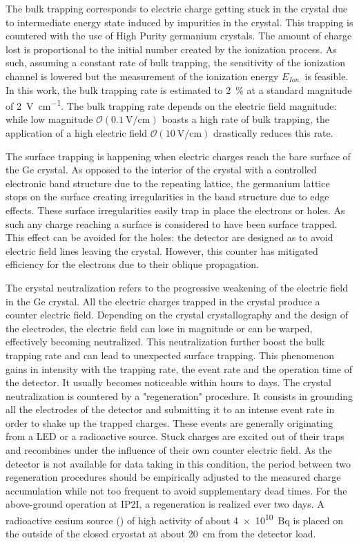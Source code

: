 The bulk trapping corresponds to electric charge getting stuck in the crystal due to intermediate energy state induced by impurities in the crystal. This trapping is countered with the use of High Purity germanium crystals. The amount of charge lost is proportional to the initial number created by the ionization process. As such, assuming a constant rate of bulk trapping, the sensitivity of the ionization channel is lowered but the measurement of the ionization energy $E_{Ion.}$ is feasible. In this work, the bulk trapping rate is estimated to \SI{2}{\percent} at a standard magnitude of \SI{2}{\volt\per\cm}. The bulk trapping rate depends on the electric field magnitude: while low magnitude $\mathcal{O}(\SI{0.1}{\volt\per\cm})$ boasts a high rate of bulk trapping, the application of a high electric field $\mathcal{O}(\SI{10}{\volt\per\cm})$ drastically reduces this rate.

The surface trapping is happening when electric charges reach the bare surface of the Ge crystal. As opposed to the interior of the crystal with a controlled electronic band structure due to the repeating lattice, the germanium lattice stops on the surface creating irregularities in the band structure due to edge effects. These surface irregularities easily trap in place the electrons or holes. As such any charge reaching a surface is considered to have been surface trapped. This effect can be avoided for the holes: the detector are designed as to avoid electric field lines leaving the crystal. However, this counter has mitigated efficiency for the electrons due to their oblique propagation.

The crystal neutralization refers to the progressive weakening of the electric field in the Ge crystal. All the electric charges trapped in the crystal produce a counter electric field. Depending on the crystal crystallography and the design of the electrodes, the electric field can lose in magnitude or can be warped, effectively becoming neutralized. This neutralization further boost the bulk trapping rate and can lead to unexpected surface trapping.
This phenomenon gains in intensity with the trapping rate, the event rate and the operation time of the detector. It usually becomes noticeable within hours to days. The crystal neutralization is countered by a "regeneration" procedure. It consists in grounding all the electrodes of the detector and submitting it to an intense event rate in order to shake up the trapped charges. These events are generally originating from a LED or a radioactive source. Stuck charges are excited out of their traps and recombines under the influence of their own counter electric field. As the detector is not available for data taking in this condition, the period between two regeneration procedures should be empirically adjusted to the measured charge accumulation while not too frequent to avoid supplementary dead times. For the above-ground operation at IP2I, a regeneration is realized ever two days. A radioactive cesium  source () of high activity of about \SI{4e10}{\becquerel} is placed on the outside of the closed cryostat at about \SI{20}{\cm} from the detector load.

